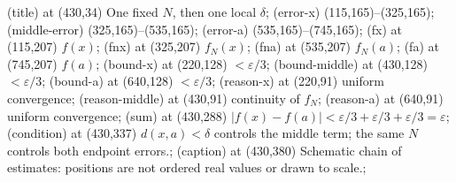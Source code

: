 \documentclass{article}
\begin{document}
\begin{loomscene}[width=860,height=400,duration=8,title={Three errors, each less than epsilon over three}]
\loomnode[label] (title) at (430,34) {One fixed $N$, then one local $\delta$};
\loomgeometry[draw=mint,line width=3bp,reveal=0] (error-x) {(115,165)--(325,165)};
\loomgeometry[draw=gold,line width=3bp,reveal=0] (middle-error) {(325,165)--(535,165)};
\loomgeometry[draw=mint,line width=3bp,reveal=0] (error-a) {(535,165)--(745,165)};
\loomnode[label] (fx) at (115,207) {$f(x)$};
\loomnode[label] (fnx) at (325,207) {$f_N(x)$};
\loomnode[label] (fna) at (535,207) {$f_N(a)$};
\loomnode[label] (fa) at (745,207) {$f(a)$};
\loomnode[label,text=mint] (bound-x) at (220,128) {$<\varepsilon/3$};
\loomnode[label,text=gold] (bound-middle) at (430,128) {$<\varepsilon/3$};
\loomnode[label,text=mint] (bound-a) at (640,128) {$<\varepsilon/3$};
\loomnode[small,text=mint] (reason-x) at (220,91) {uniform convergence};
\loomnode[small,text=gold] (reason-middle) at (430,91) {continuity of $f_N$};
\loomnode[small,text=mint] (reason-a) at (640,91) {uniform convergence};
\loomnode[label] (sum) at (430,288) {$|f(x)-f(a)|<\varepsilon/3+\varepsilon/3+\varepsilon/3=\varepsilon$};
\loomnode[small] (condition) at (430,337) {$d(x,a)<\delta$ controls the middle term; the same $N$ controls both endpoint errors.};
\loomnode[small] (caption) at (430,380) {Schematic chain of estimates: positions are not ordered real values or drawn to scale.};
\end{loomscene}
\end{document}
